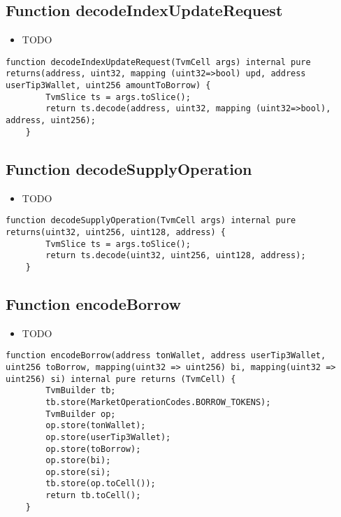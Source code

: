 \subsection{Function decodeIndexUpdateRequest}

\noindent\begin{itemize}
\item TODO
\end{itemize}

\begin{lstlisting}[firstnumber=101]
    function decodeIndexUpdateRequest(TvmCell args) internal pure returns(address, uint32, mapping (uint32=>bool) upd, address userTip3Wallet, uint256 amountToBorrow) {
        TvmSlice ts = args.toSlice();
        return ts.decode(address, uint32, mapping (uint32=>bool), address, uint256);
    }
\end{lstlisting}

\subsection{Function decodeSupplyOperation}

\noindent\begin{itemize}
\item TODO
\end{itemize}

\begin{lstlisting}[firstnumber=21]
    function decodeSupplyOperation(TvmCell args) internal pure returns(uint32, uint256, uint128, address) {
        TvmSlice ts = args.toSlice();
        return ts.decode(uint32, uint256, uint128, address);
    }
\end{lstlisting}

\subsection{Function encodeBorrow}

\noindent\begin{itemize}
\item TODO
\end{itemize}

\begin{lstlisting}[firstnumber=53]
    function encodeBorrow(address tonWallet, address userTip3Wallet, uint256 toBorrow, mapping(uint32 => uint256) bi, mapping(uint32 => uint256) si) internal pure returns (TvmCell) {
        TvmBuilder tb;
        tb.store(MarketOperationCodes.BORROW_TOKENS);
        TvmBuilder op;
        op.store(tonWallet);
        op.store(userTip3Wallet);
        op.store(toBorrow);
        op.store(bi);
        op.store(si);
        tb.store(op.toCell());
        return tb.toCell();
    }
\end{lstlisting}

